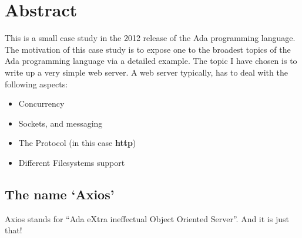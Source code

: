 \section{Abstract} 
This is a small case study in the 2012 release of the Ada programming language. The motivation of this case study is to expose one to the broadest topics of the Ada programming language via a detailed example. The topic I have chosen is to write up a very simple web server. A web server typically, has to deal with the following aspects:
\begin{itemize}
\item Concurrency
\item Sockets, and messaging
\item The Protocol (in this case \textbf{http})
\item Different Filesystems support
\end{itemize} 

\subsection{The name `Axios'}
Axios stands for ``Ada eXtra ineffectual Object Oriented Server''. And it is just that!
